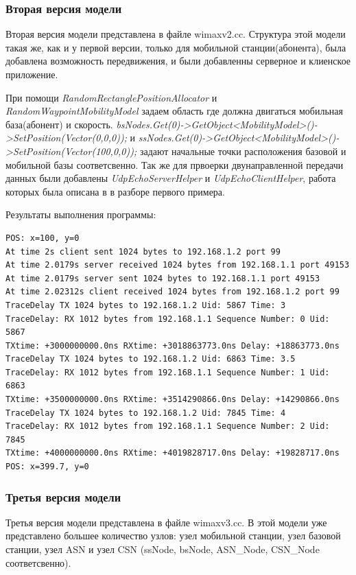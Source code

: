 \documentclass[14pt,a4paper]{article}
\begin{document}
\subsubsection{Вторая версия модели}
Вторая версия модели представлена в файле wimaxv2.cc. Структура этой модели
такая же, как и у первой версии, только для мобильной станции(абонента), была
добавлена возможность передвижения, и были добавленны серверное и клиенское
приложение.

При помощи \textit{RandomRectanglePositionAllocator} и
\textit{RandomWaypointMobilityModel} задаем область где должна двигаться
мобильная база(абонент) и скорость.
\textit{bsNodes.Get(0)->GetObject<MobilityModel>()->SetPosition(Vector(0,0,0));}
и
\textit{ssNodes.Get(0)->GetObject<MobilityModel>()->SetPosition(Vector(100,0,0));}
задают начальные точки расположения  базовой и мобильной базы соответсвенно. Так
же для првоерки двунаправленной передачи данных были добавлены
\textit{UdpEchoServerHelper} и \textit{UdpEchoClientHelper}, работа которых была
описана в в разборе первого примера.

\vspace{1cm}
Результаты выполнения программы:
\begin{verbatim}
POS: x=100, y=0
At time 2s client sent 1024 bytes to 192.168.1.2 port 99
At time 2.0179s server received 1024 bytes from 192.168.1.1 port 49153
At time 2.0179s server sent 1024 bytes to 192.168.1.1 port 49153
At time 2.02312s client received 1024 bytes from 192.168.1.2 port 99
TraceDelay TX 1024 bytes to 192.168.1.2 Uid: 5867 Time: 3
TraceDelay: RX 1012 bytes from 192.168.1.1 Sequence Number: 0 Uid: 5867 
TXtime: +3000000000.0ns RXtime: +3018863773.0ns Delay: +18863773.0ns
TraceDelay TX 1024 bytes to 192.168.1.2 Uid: 6863 Time: 3.5
TraceDelay: RX 1012 bytes from 192.168.1.1 Sequence Number: 1 Uid: 6863 
TXtime: +3500000000.0ns RXtime: +3514290866.0ns Delay: +14290866.0ns
TraceDelay TX 1024 bytes to 192.168.1.2 Uid: 7845 Time: 4
TraceDelay: RX 1012 bytes from 192.168.1.1 Sequence Number: 2 Uid: 7845 
TXtime: +4000000000.0ns RXtime: +4019828717.0ns Delay: +19828717.0ns
POS: x=399.7, y=0
\end{verbatim}

\subsubsection{Третья версия модели}
Третья версия модели представлена в файле wimaxv3.cc. В этой модели уже
представлено большее количество узлов: узел мобильной станции, узел базовой
станции, узел ASN и узел CSN (ssNode, bsNode, ASN\_Node, CSN\_Node
соответсвенно).
\end{document}
